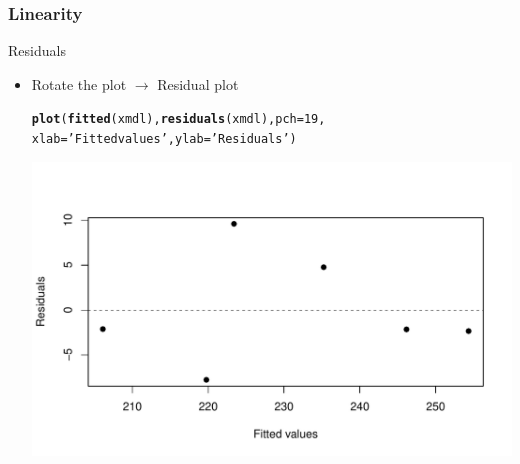 \documentclass[10p]{beamer}\usepackage[]{graphicx}\usepackage[]{color}
\makeatletter
\def\maxwidth{ %
  \ifdim\Gin@nat@width>\linewidth
    \linewidth
  \else
    \Gin@nat@width
  \fi
}
\newcommand{\hlnum}[1]{\textcolor[rgb]{0.686,0.059,0.569}{#1}}%
\newcommand{\hlstr}[1]{\textcolor[rgb]{0.192,0.494,0.8}{#1}}%
\newcommand{\hlstd}[1]{\textcolor[rgb]{0.345,0.345,0.345}{#1}}%
\newcommand{\hlkwc}[1]{\textcolor[rgb]{0.333,0.667,0.333}{#1}}%
\newcommand{\hlkwd}[1]{\textcolor[rgb]{0.737,0.353,0.396}{\textbf{#1}}}%
\newenvironment{kframe}{%
 \def\at@end@of@kframe{}%
 \ifinner\ifhmode%
  \def\at@end@of@kframe{\end{minipage}}%
  \begin{minipage}{\columnwidth}%
 \fi\fi%
 \def\FrameCommand##1{\hskip\@totalleftmargin \hskip-\fboxsep
 \colorbox{shadecolor}{##1}\hskip-\fboxsep
     \hskip-\linewidth \hskip-\@totalleftmargin \hskip\columnwidth}%
 \MakeFramed {\advance\hsize-\width
   \@totalleftmargin\z@ \linewidth\hsize
   \@setminipage}}%
 {\par\unskip\endMakeFramed%
 \at@end@of@kframe}
\newenvironment{knitrout}{}{} %
\makeatother
\begin{document}
\begin{frame}[fragile]
\frametitle{Linearity}
Residuals
\begin{itemize}
\item Rotate the plot $\rightarrow$ Residual plot

\begin{knitrout}\footnotesize
{}\color{fgcolor}\begin{kframe}
\begin{alltt}
\hlkwd{plot}\hlstd{(}\hlkwd{fitted}\hlstd{(xmdl),} \hlkwd{residuals}\hlstd{(xmdl),}\hlkwc{pch}\hlstd{=}\hlnum{19}\hlstd{,}
        \hlkwc{xlab} \hlstd{=} \hlstr{'Fitted values'}\hlstd{,} \hlkwc{ylab}\hlstd{=}\hlstr{'Residuals'} \hlstd{)}
\end{alltt}
\end{kframe}
\includegraphics[width=\maxwidth]{figure/residual_plot-1} 

\end{knitrout}

\end{itemize}
\end{frame}
\end{document}
